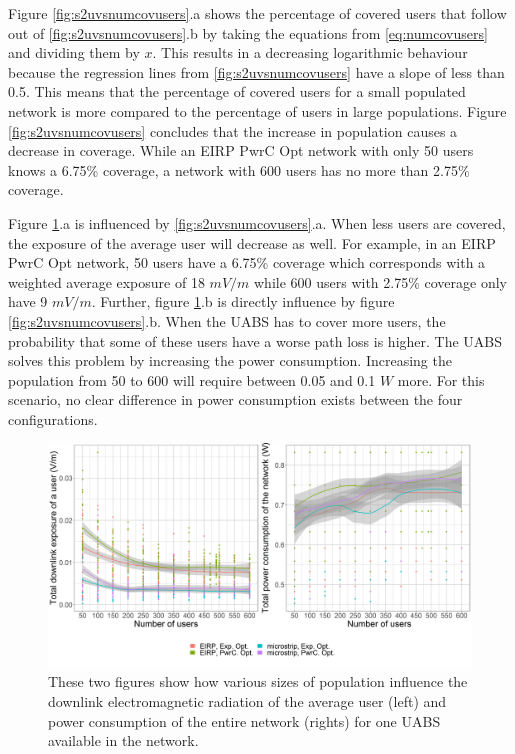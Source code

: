 Figure \ref{fig:s2uvsnumcovusers}.a shows the percentage of covered users that follow out of \ref{fig:s2uvsnumcovusers}.b by taking the equations 
from \ref{eq:numcovusers} and dividing them by $x$.
This results in a decreasing logarithmic behaviour because the regression lines from  \ref{fig:s2uvsnumcovusers} have a slope of less than 0.5.
This means that the percentage of covered users for a small populated network is more compared to the percentage of users in large populations.
Figure \ref{fig:s2uvsnumcovusers} concludes that the increase in population causes a decrease in coverage.
While an \gls{EIRP} \gls{PwrC Opt} network with only 50 users knows  a 6.75\% coverage, a network with 600 users has no more than 2.75\% coverage.

\clearpage
Figure  \ref{fig:s2b_dlAndPc}.a  is influenced by  \ref{fig:s2uvsnumcovusers}.a. When less users are 
covered, the exposure of the average user will decrease as well.
For example, in an EIRP \gls{PwrC Opt} network, 50 users have a 6.75\% coverage which corresponds with a weighted average exposure of  18 $mV/m$
while 600 users with 2.75\% coverage only have 9 $mV/m$.
Further,  figure \ref{fig:s2b_dlAndPc}.b is directly influence by figure \ref{fig:s2uvsnumcovusers}.b. When the \gls{UABS} has to cover more users,
the probability that some of these users have a worse path loss is higher. The \gls{UABS} solves this problem by increasing the 
power consumption. Increasing the population from 50 to 600 will require between 0.05 and 0.1 $W$ more. 
For this scenario, no clear difference in power consumption exists between the four configurations.
\begin{figure}[h!]
  \includegraphics[width=\textwidth]{../results/s2/uvsdlAndPc.png}
  \caption{These two figures show how various sizes of population influence the downlink electromagnetic radiation of the average user (left) and 
  power consumption of the entire network (rights) for one \acs{UABS} available in the network.}
  \label{fig:s2b_dlAndPc}
\end{figure}

